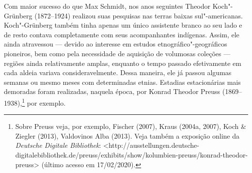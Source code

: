 Com maior sucesso do que Max Schmidt, nos anos seguintes Theodor
Koch"-Grünberg (1872--1924) realizou suas pesquisas nas terras baixas
sul"-americanas. Koch"-Grünberg também tinha apenas um único assistente
branco ao seu lado e de resto contava completamente com seus
acompanhantes indígenas. Assim, ele ainda atravessou --- devido ao
interesse em estudos etnográfico"-geográficos pioneiros, bem como pela
necessidade de aquisição de volumosas coleções --- regiões ainda
relativamente amplas, enquanto o tempo passado efetivamente em cada
aldeia variava consideravelmente. Dessa maneira, ele já passou algumas
semanas ou mesmo meses com determinadas etnias. Estadias estacionárias
mais demoradas foram realizadas, naquela época, por Konrad Theodor
Preuss (1869--1938),\footnote{Sobre Preuss veja, por exemplo, Fischer
  (2007), Kraus (2004a, 2007), Koch \& Ziegler (2013), Valdovinos Alba
  (2013). Veja também a exposição online da \emph{Deutsche Digitale
  Bibliothek}:
  \textless{}http://ausstellungen.deutsche-digitalebibliothek.de/preuss/exhibits/show/kolumbien-preuss/konrad-theodor-preuss\textgreater{}
  (último acesso em 17/02/2020).} por exemplo.

